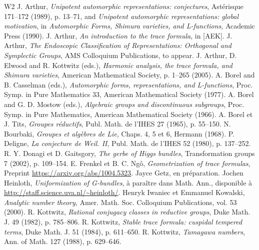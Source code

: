 
\begin{thebibliography}{W2}
 J. Arthur, \textit{Unipotent automorphic representations: conjectures}, Astérisque 171--172 (1989), p. 13--71, and \textit{Unipotent automorphic representations: global motivation}, in \textit{Automorphic Forms, Shimura varieties, and L-functions}, Academic Press (1990).
 J. Arthur, \textit{An introduction to the trace formula}, in [AEK].
 J. Arthur, \textit{The Endoscopic Classification of Representations: Orthogonal and Symplectic Groups}, AMS Colloquium Publications, to appear.
 J. Arthur, D. Elwood and R. Kottwitz (eds.), \textit{Harmonic analysis, the trace formula, and Shimura varieties}, American Mathematical Society, p. 1--265 (2005).
 A. Borel and B. Casselman (eds.), \textit{Automorphic forms, representations, and L-functions}, Proc. Symp. in Pure Mathematics 33, American Mathematical Society (1977).
 A. Borel and G. D. Mostow (eds.), \textit{Algebraic groups and discontinuous subgroups}, Proc. Symp. in Pure Mathematics, American Mathematical Society (1966).
 A. Borel et J. Tits, \textit{Groupes réductifs}, Publ. Math. de l'IHES 27 (1965), p. 55--150.
 N. Bourbaki, \textit{Groupes et algèbres de Lie}, Chaps. 4, 5 et 6, Hermann (1968).
 P. Deligne, \textit{La conjecture de Weil. II}, Publ. Math. de l'IHES 52 (1980), p. 137--252.
 R. Y. Donagi et D. Gaitsgory, \textit{The gerbe of Higgs bundles}, Transformation groups 7 (2002), p. 109--154.
 E. Frenkel et B. C. Ngô, \textit{Geometrization of trace formulas}, Preprint \url{https://arxiv.org/abs/1004.5323}.
 Jayce Getz, en préparation.
 Jochen Heinloth, \textit{Uniformization of G-bundles}, à paraître dans Math. Ann., disponible à \url{http://staff.science.uva.nl/~heinloth/}.
 Henryk Iwaniec et Emmanuel Kowalski, \textit{Analytic number theory}, Amer. Math. Soc. Colloquium Publications, vol. 53 (2000).
 R. Kottwitz, \textit{Rational conjugacy classes in reductive groups}, Duke Math. J. 49 (1982), p. 785--806.
 R. Kottwitz, \textit{Stable trace formula: cuspidal tempered terms}, Duke Math. J. 51 (1984), p. 611--650.
 R. Kottwitz, \textit{Tamagawa numbers}, Ann. of Math. 127 (1988), p. 629--646.

\end{thebibliography}
